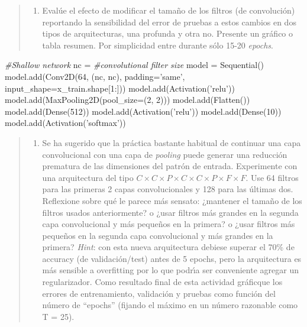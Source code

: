 \documentclass[11pt]{article}
\providecommand{\tightlist}{%
      \setlength{\itemsep}{0pt}\setlength{\parskip}{0pt}}
\newenvironment{Shaded}{}{}
\newcommand{\DecValTok}[1]{\textcolor[rgb]{0.25,0.63,0.44}{{#1}}}
\newcommand{\StringTok}[1]{\textcolor[rgb]{0.25,0.44,0.63}{{#1}}}
\newcommand{\CommentTok}[1]{\textcolor[rgb]{0.38,0.63,0.69}{\textit{{#1}}}}
\newcommand{\NormalTok}[1]{{#1}}
\newcommand{\OperatorTok}[1]{\textcolor[rgb]{0.40,0.40,0.40}{{#1}}}
\begin{document}
\begin{quote}
\begin{enumerate}
\def\labelenumi{\alph{enumi})}
\setcounter{enumi}{5}
\tightlist
\item
  Evalúe el efecto de modificar el tamaño de los filtros (de
  convolución) reportando la sensibilidad del error de pruebas a estos
  cambios en dos tipos de arquitecturas, una profunda y otra no.
  Presente un gráfico o tabla resumen. Por simplicidad entre durante
  sólo 15-20 \emph{epochs}.
\end{enumerate}
\end{quote}

\begin{Shaded}
\begin{Highlighting}[]
\CommentTok{#Shallow network}
\NormalTok{nc }\OperatorTok{=} \CommentTok{#convolutional filter size}
\NormalTok{model }\OperatorTok{=}\NormalTok{ Sequential()}
\NormalTok{model.add(Conv2D(}\DecValTok{64}\NormalTok{, (nc, nc), padding}\OperatorTok{=}\StringTok{'same'}\NormalTok{, input_shape}\OperatorTok{=}\NormalTok{x_train.shape[}\DecValTok{1}\NormalTok{:]))}
\NormalTok{model.add(Activation(}\StringTok{'relu'}\NormalTok{))}
\NormalTok{model.add(MaxPooling2D(pool_size}\OperatorTok{=}\NormalTok{(}\DecValTok{2}\NormalTok{, }\DecValTok{2}\NormalTok{)))}
\NormalTok{model.add(Flatten())}
\NormalTok{model.add(Dense(}\DecValTok{512}\NormalTok{))}
\NormalTok{model.add(Activation(}\StringTok{'relu'}\NormalTok{))}
\NormalTok{model.add(Dense(}\DecValTok{10}\NormalTok{))}
\NormalTok{model.add(Activation(}\StringTok{'softmax'}\NormalTok{))}
\end{Highlighting}
\end{Shaded}

\begin{quote}
\begin{enumerate}
\def\labelenumi{\alph{enumi})}
\setcounter{enumi}{6}
\tightlist
\item
  Se ha sugerido que la práctica bastante habitual de continuar una capa
  convolucional con una capa de \emph{pooling} puede generar una
  reducción prematura de las dimensiones del patrón de entrada.
  Experimente con una arquitectura del tipo
  \(C \times C \times P \times C \times C \times P \times F \times F\).
  Use 64 filtros para las primeras 2 capas convolucionales y 128 para
  las últimas dos. Reflexione sobre qué le parece más sensato: ¿mantener
  el tamaño de los filtros usados anteriormente? o ¿usar filtros más
  grandes en la segunda capa convolucional y más pequeños en la primera?
  o ¿usar filtros más pequeños en la segunda capa convolucional y más
  grandes en la primera? \emph{Hint}: con esta nueva arquitectura
  debiese superar el 70\% de accuracy (de validación/test) antes de 5
  epochs, pero la arquitectura es más sensible a overfitting por lo que
  podrı́a ser conveniente agregar un regularizador. Como resultado final
  de esta actividad gráficque los errores de entrenamiento, validación y
  pruebas como función del número de ``epochs'' (fijando el máximo en un
  número razonable como T = 25).
\end{enumerate}
\end{quote}
\end{document}
